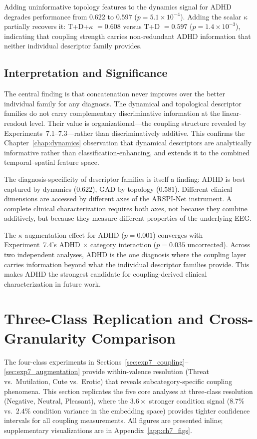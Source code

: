 Adding uninformative topology features to the dynamics signal for ADHD degrades performance from $0.622$ to $0.597$ ($p = 5.1 \times 10^{-4}$). Adding the scalar $\kappa$ partially recovers it: T+D+$\kappa$ $= 0.608$ versus T+D $= 0.597$ ($p = 1.4 \times 10^{-3}$), indicating that coupling strength carries non-redundant ADHD information that neither individual descriptor family provides.

\subsection{Interpretation and Significance}

The central finding is that concatenation never improves over the better individual family for any diagnosis. The dynamical and topological descriptor families do not carry complementary discriminative information at the linear-readout level. Their value is organizational---the coupling structure revealed by Experiments~7.1--7.3---rather than discriminatively additive. This confirms the Chapter~\ref{chap:dynamics} observation that dynamical descriptors are analytically informative rather than classification-enhancing, and extends it to the combined temporal--spatial feature space.

The diagnosis-specificity of descriptor families is itself a finding: ADHD is best captured by dynamics ($0.622$), GAD by topology ($0.581$). Different clinical dimensions are accessed by different axes of the ARSPI-Net instrument. A complete clinical characterization requires both axes, not because they combine additively, but because they measure different properties of the underlying EEG.

The $\kappa$ augmentation effect for ADHD ($p = 0.001$) converges with Experiment~7.4's ADHD $\times$ category interaction ($p = 0.035$ uncorrected). Across two independent analyses, ADHD is the one diagnosis where the coupling layer carries information beyond what the individual descriptor families provide. This makes ADHD the strongest candidate for coupling-derived clinical characterization in future work.


\section{Three-Class Replication and Cross-Granularity Comparison}
\label{sec:ch7_3class}

The four-class experiments in Sections~\ref{sec:exp7_coupling}--\ref{sec:exp7_augmentation} provide within-valence resolution (Threat vs.\ Mutilation, Cute vs.\ Erotic) that reveals subcategory-specific coupling phenomena. This section replicates the five core analyses at three-class resolution (Negative, Neutral, Pleasant), where the $3.6\times$ stronger condition signal ($8.7\%$ vs.\ $2.4\%$ condition variance in the embedding space) provides tighter confidence intervals for all coupling measurements. All figures are presented inline; supplementary visualizations are in Appendix~\ref{app:ch7_figs}.

